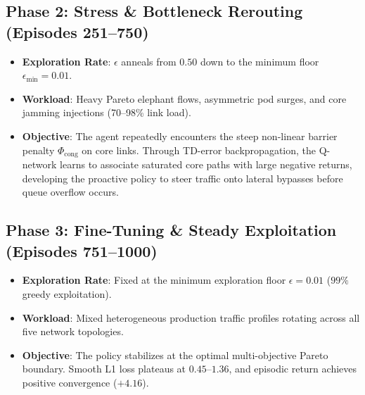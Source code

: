 \subsection{Phase 2: Stress \& Bottleneck Rerouting (Episodes 251--750)}
\begin{itemize}
    \item \textbf{Exploration Rate}: $\epsilon$ anneals from $0.50$ down to the minimum floor $\epsilon_{\text{min}} = 0.01$.
    \item \textbf{Workload}: Heavy Pareto elephant flows, asymmetric pod surges, and core jamming injections (70--98\% link load).
    \item \textbf{Objective}: The agent repeatedly encounters the steep non-linear barrier penalty $\Phi_{\text{cong}}$ on core links. Through TD-error backpropagation, the Q-network learns to associate saturated core paths with large negative returns, developing the proactive policy to steer traffic onto lateral bypasses before queue overflow occurs.
\end{itemize}

\subsection{Phase 3: Fine-Tuning \& Steady Exploitation (Episodes 751--1000)}
\begin{itemize}
    \item \textbf{Exploration Rate}: Fixed at the minimum exploration floor $\epsilon = 0.01$ ($99\%$ greedy exploitation).
    \item \textbf{Workload}: Mixed heterogeneous production traffic profiles rotating across all five network topologies.
    \item \textbf{Objective}: The policy stabilizes at the optimal multi-objective Pareto boundary. Smooth L1 loss plateaus at $0.45$--$1.36$, and episodic return achieves positive convergence ($+4.16$).
\end{itemize}
